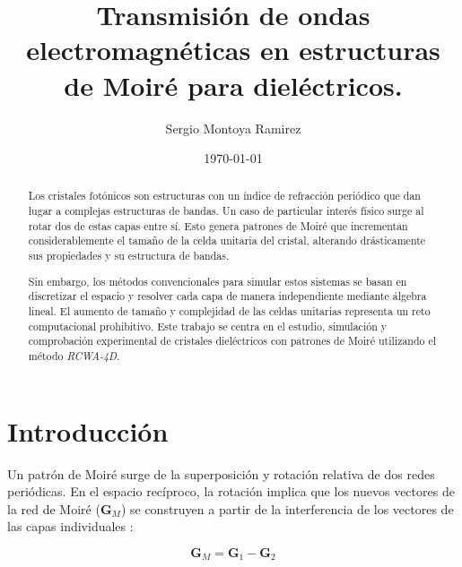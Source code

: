 \documentclass[a4paper, amsfonts, amssymb, amsmath, reprint, showkeys, nofootinbib, twoside]{revtex4-1}
\begin{document}
\title{Transmisión de ondas electromagnéticas en estructuras de Moiré para dieléctricos.}

\author{Sergio Montoya Ramirez}

  


\date{\today} %

\begin{abstract}
Los cristales fotónicos son estructuras con un índice de refracción periódico que dan lugar a complejas estructuras de bandas. Un caso de particular interés físico surge al rotar dos de estas capas entre sí. Esto genera patrones de Moiré que incrementan considerablemente el tamaño de la celda unitaria del cristal, alterando drásticamente sus propiedades y su estructura de bandas.

Sin embargo, los métodos convencionales para simular estos sistemas se basan en discretizar el espacio y resolver cada capa de manera independiente mediante álgebra lineal. El aumento de tamaño y complejidad de las celdas unitarias representa un reto computacional prohibitivo. Este trabajo se centra en el estudio, simulación y comprobación experimental de cristales dieléctricos con patrones de Moiré utilizando el método \textit{RCWA-4D}.
\end{abstract}

\maketitle
\section{Introducción}

Un patrón de Moiré surge de la superposición y rotación relativa de dos redes periódicas. En el espacio recíproco, la rotación implica que los nuevos vectores de la red de Moiré ($\mathbf{G}_M$) se construyen a partir de la interferencia de los vectores de las capas individuales \cite{lou2025rcwa4d}:

\begin{equation}
\mathbf{G}_M = \mathbf{G}_1 - \mathbf{G}_2
\end{equation}
\end{document}
